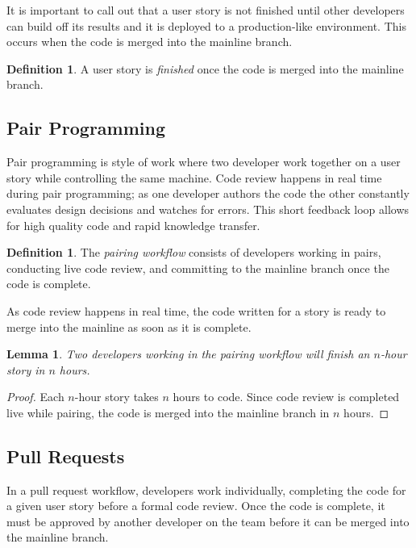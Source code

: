 \documentclass[letterpaper]{article}
\newtheorem{lemma}[theorem]{Lemma}
\theoremstyle{definition}
\newtheorem{definition}[theorem]{Definition}
\begin{document}
    It is important to call out that a user story is not finished until other developers can build off its results and
    it is deployed to a production-like environment.
    This occurs when the code is merged into the mainline branch.

    \begin{definition}
        A user story is \textit{finished} once the code is merged into the mainline branch.
    \end{definition}

    \subsection{Pair Programming}\label{subsec:pairing}

    Pair programming is style of work where two developer work together on a user story while controlling the same machine.
    Code review happens in real time during pair programming;
    as one developer authors the code the other constantly evaluates design decisions and watches for errors.
    This short feedback loop allows for high quality code and rapid knowledge transfer.

    \begin{definition}
        The \textit{pairing workflow} consists of developers working in pairs, conducting live code review, and
        committing to the mainline branch once the code is complete.
    \end{definition}

    As code review happens in real time, the code written for a story is ready to merge into the mainline as soon as it
    is complete.

    \begin{lemma}
        \label{lemma:pair}
        Two developers working in the pairing workflow will finish an $n$-hour story in $n$ hours.
    \end{lemma}
    \begin{proof}
        Each $n$-hour story takes $n$ hours to code.
        Since code review is completed live while pairing, the code is merged into the mainline branch in $n$ hours.
    \end{proof}

    \subsection{Pull Requests}\label{subsec:pull-requests}

    In a pull request workflow, developers work individually, completing the code for a given user story before a formal
    code review.
    Once the code is complete, it must be approved by another developer on the team before it can be merged into the
    mainline branch.
\end{document}
